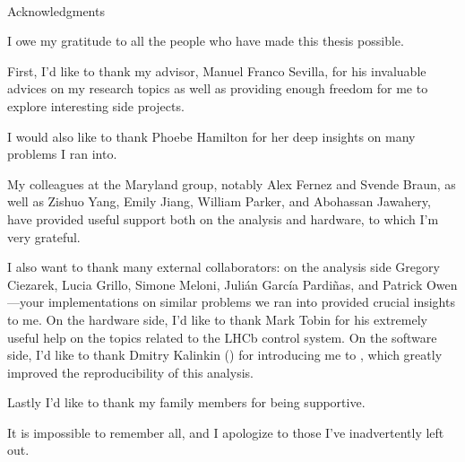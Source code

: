 \hbox{\ }
\vspace{.5in}
\renewcommand{\baselinestretch}{2}

\begin{center}
\large{Acknowledgments}
\end{center}

\vspace{1ex}

I owe my gratitude to all the people who have made this thesis possible.

First, I'd like to thank my advisor, Manuel Franco Sevilla,
for his invaluable advices on my research topics as well as providing enough
freedom for me to explore interesting side projects.

I would also like to thank Phoebe Hamilton for her deep insights on many
problems I ran into.

My colleagues at the Maryland group, notably Alex Fernez and Svende Braun,
as well as Zishuo Yang, Emily Jiang, William Parker, and Abohassan Jawahery,
have provided useful support both on the analysis and hardware,
to which I'm very grateful.

I also want to thank many external collaborators:
on the analysis side Gregory Ciezarek, Lucia Grillo, Simone Meloni,
Julián García Pardiñas, and Patrick Owen---your implementations on similar
problems we ran into provided crucial insights to me.
On the hardware side, I'd like to thank Mark Tobin for his extremely useful
help on the topics related to the LHCb control system.
On the software side, I'd like to thank Dmitry Kalinkin () for
introducing me to , which greatly improved the reproducibility of
this analysis.

Lastly I'd like to thank my family members for being supportive.

It is impossible to remember all, and I apologize to those I've inadvertently
left out.
